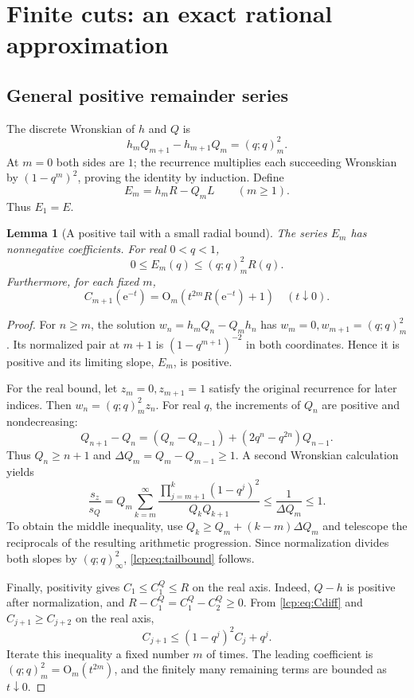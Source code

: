 \documentclass[11pt]{article}
\numberwithin{equation}{section}
\newtheorem{lemma}[theorem]{Lemma}
\theoremstyle{definition}\newtheorem{definition}[theorem]{Definition}
\theoremstyle{remark}\newtheorem{remark}[theorem]{Remark}
\newcommand{\OO}{\mathrm O}
\newcommand{\pp}[1]{(q;q)_{#1}}
\newcommand{\ee}{\mathrm e}
\begin{document}
\section{Finite cuts: an exact rational approximation}
\subsection{General positive remainder series}
The discrete Wronskian of $h$ and $Q$ is
\begin{equation}\label{lcp:eq:wronskian}
 h_mQ_{m+1}-h_{m+1}Q_m=\pp m^2.
\end{equation}
At $m=0$ both sides are $1$; the recurrence multiplies each succeeding
Wronskian by $(1-q^m)^2$, proving the identity by induction.
Define
\begin{equation}\label{lcp:eq:Em}
 E_m=h_mR-Q_mL\qquad(m\ge1).
\end{equation}
Thus $E_1=E$.

\begin{lemma}[A positive tail with a small radial bound]\label{lcp:lem:tail}
The series $E_m$ has nonnegative coefficients. For real $0<q<1$,
\begin{equation}\label{lcp:eq:tailbound}
 0\le E_m(q)\le\pp m^2R(q).
\end{equation}
Furthermore, for each fixed $m$,
\begin{equation}\label{lcp:eq:Ctail}
 C_{m+1}(\ee^{-t})=\OO_m(t^{2m}R(\ee^{-t})+1)
 \quad(t\downarrow0).
\end{equation}
\end{lemma}
\begin{proof}
For $n\ge m$, the solution $w_n=h_mQ_n-Q_mh_n$ has
$w_m=0,w_{m+1}=\pp m^2$. Its normalized pair at $m+1$ is
$(1-q^{m+1})^{-2}$ in both coordinates. Hence it is positive and its
limiting slope, $E_m$, is positive.

For the real bound, let $z_m=0,z_{m+1}=1$ satisfy the original recurrence
for later indices. Then $w_n=\pp m^2z_n$.
For real $q$, the increments of $Q_n$ are positive and nondecreasing:
\[
 Q_{n+1}-Q_n=(Q_n-Q_{n-1})+(2q^n-q^{2n})Q_{n-1}.
\]
Thus $Q_n\ge n+1$ and $\Delta Q_m=Q_m-Q_{m-1}\ge1$.
A second Wronskian calculation yields
\[
 \frac{s_z}{s_Q}
 =Q_m\sum_{k=m}^\infty
 \frac{\prod_{j=m+1}^{k}(1-q^j)^2}{Q_kQ_{k+1}}
 \le\frac1{\Delta Q_m}\le1.
\]
To obtain the middle inequality, use
$Q_k\ge Q_m+(k-m)\Delta Q_m$ and telescope the reciprocals of the
resulting arithmetic progression. Since normalization divides both
slopes by $\pp\infty^2$, \eqref{lcp:eq:tailbound} follows.

Finally, positivity gives $C_1\le C^Q_1\le R$ on the real axis.
Indeed, $Q-h$ is positive after normalization, and
$R-C^Q_1=C^Q_1-C^Q_2\ge0$.
From \eqref{lcp:eq:Cdiff} and $C_{j+1}\ge C_{j+2}$ on the real axis,
\[
 C_{j+1}\le(1-q^j)^2C_j+q^j.
\]
Iterate this inequality a fixed number $m$ of times. The leading
coefficient is $\pp m^2=\OO_m(t^{2m})$, and the finitely many remaining
terms are bounded as $t\downarrow0$.
\end{proof}
\end{document}
